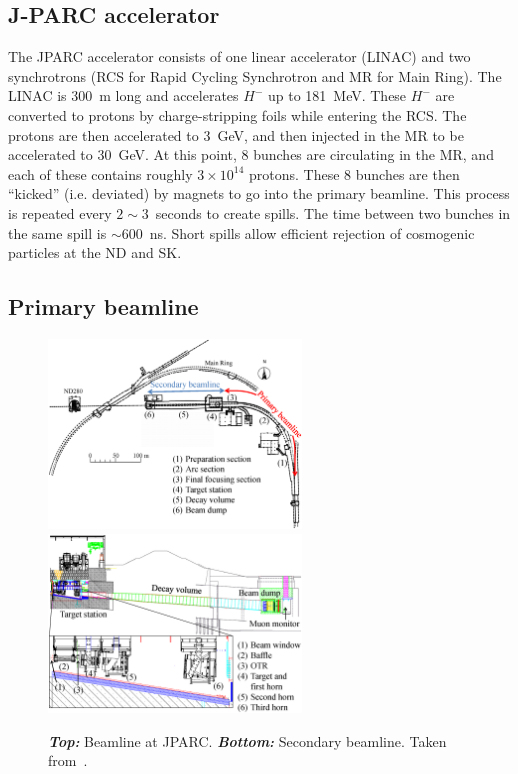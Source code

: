 \subsection{J-PARC accelerator}
\label{subsec:jparcaccelerator}
The \Gls{JPARC} accelerator consists of one linear accelerator
(\Gls{LINAC}) and two synchrotrons (\Gls{RCS} for Rapid Cycling
Synchrotron and \gls{MR} for Main Ring). The \Gls{LINAC} is 300~m long
and accelerates $H^-$ up to 181~MeV. These $H^-$ are converted to
protons by charge-stripping foils while entering the RCS. The protons
are then accelerated to 3~GeV, and then injected in the \Gls{MR} to be
accelerated to 30~GeV. At this point, 8 bunches are circulating in the
\Gls{MR}, and each of these contains roughly $3\times 10^{14}$
protons.  These 8 bunches are then ``kicked'' (i.e. deviated) by
magnets to go into the primary beamline. This process is repeated
every $2\sim 3$~seconds to create spills.  The time between two
bunches in the same spill is $\sim 600$~ns.  Short spills allow
efficient rejection of cosmogenic particles at the \Gls{ND} and
\Gls{SK}.

\subsection{Primary beamline}
\label{subsec:primarybeam}

\begin{figure}[ht]
  \center
  \includegraphics[width=0.6\textwidth]{images/t2k/beamline.eps} \\
  \includegraphics[width=0.6\textwidth]{images/t2k/beamline_sec.eps}
  \caption[Beamline and secondary beamline at
  J-PARC]{\textbf{\textit{Top:}} Beamline at
    \Gls{JPARC}. \textbf{\textit{Bottom:}} Secondary beamline. Taken
    from~\cite{FluxT2K2013}.}
  \label{fig:beamline}
\end{figure}

